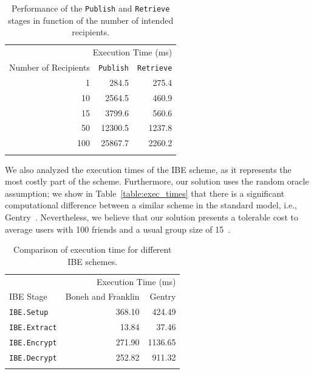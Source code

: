 \documentclass[journal]{IEEEtran}
\newcommand{\tabref}[1]{{Table}~\ref{#1}}
\newcommand{\ms}{\ensuremath{ms}}
\begin{document}
\begin{table}
  \centering
  \begin{tabular}{@{}rrr@{}} \toprule
    \multicolumn{3}{r}{Execution Time (ms)} \\ \cmidrule(r){2-3}
    Number of Recipients & \texttt{Publish} & \texttt{Retrieve} \\ \midrule
    1 & 284.5 & 275.4  \\
    10 & 2564.5  & 460.9  \\
    15 & 3799.6  & 560.6  \\
    50 & 12300.5  & 1237.8  \\
    100 & 25867.7  & 2260.2  \\  \bottomrule
    & & \\
  \end{tabular}
  \caption{Performance of the \texttt{Publish} and \texttt{Retrieve} stages in function of the number of intended recipients.}
  \label{table:BE_exec_times}
\end{table}

We also analyzed the execution times of the IBE scheme, as it represents the most costly part of the scheme. Furthermore, our solution uses the random oracle assumption; we show in \tabref{table:exec_times} that there is a significant computational difference between a similar scheme in the standard model, i.e., Gentry~\cite{GentryRandomOracles}.
Nevertheless, we believe that our solution presents a tolerable cost to average users with 100 friends and a usual group size of 15~\cite{DBLP:journals/corr/abs-1111-4503}. 

\begin{table}
  \centering
  \begin{tabular}{@{}lrr@{}} \toprule
    \multicolumn{3}{r}{Execution Time (ms)} \\ \cmidrule(r){2-3}
    IBE Stage & Boneh and Franklin & Gentry \\ \midrule
    \texttt{IBE.Setup} & 368.10  &  424.49  \\
  \texttt{IBE.Extract} & 13.84  & 37.46  \\
  \texttt{IBE.Encrypt} & 271.90  & 1136.65  \\
  \texttt{IBE.Decrypt} & 252.82  & 911.32 \\ \bottomrule
    & & \\
  \end{tabular}
  \caption{Comparison of execution time for different IBE schemes.}
  \label{table:BE_exec_times}
\end{table}
\end{document}
